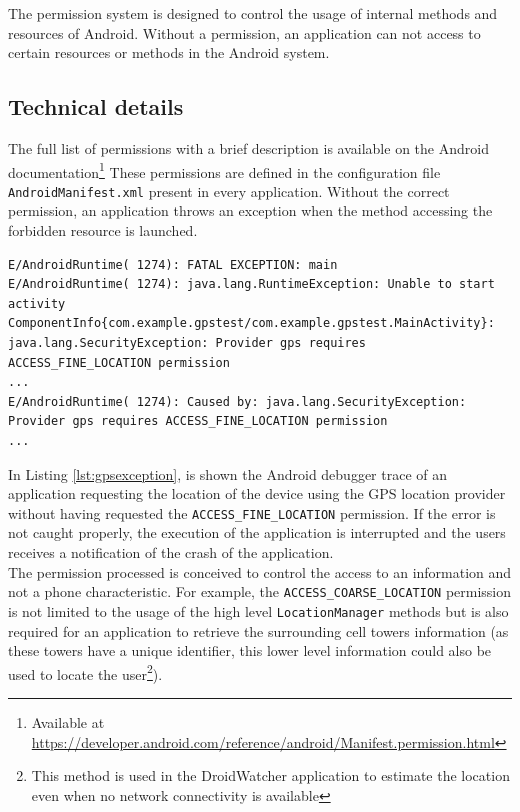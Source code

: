 The permission system is designed to control the usage of internal methods and resources of Android.
Without a permission, an application can not access to certain resources or methods in the Android system.

\subsection{Technical details}
The full list of permissions with a brief description is available on the Android documentation\footnote{Available at \url{https://developer.android.com/reference/android/Manifest.permission.html}}
These permissions are defined in the configuration file \texttt{AndroidManifest.xml} present in every application.
Without the correct permission, an application throws an exception when the method accessing the forbidden resource is launched.

\begin{lstlisting}[breaklines,caption={Example of permission violation log},label={lst:gpsexception},numbers=none]
E/AndroidRuntime( 1274): FATAL EXCEPTION: main
E/AndroidRuntime( 1274): java.lang.RuntimeException: Unable to start activity ComponentInfo{com.example.gpstest/com.example.gpstest.MainActivity}: java.lang.SecurityException: Provider gps requires ACCESS_FINE_LOCATION permission
...
E/AndroidRuntime( 1274): Caused by: java.lang.SecurityException: Provider gps requires ACCESS_FINE_LOCATION permission
...
\end{lstlisting}

In Listing \ref{lst:gpsexception}, is shown the Android debugger trace of an application requesting the location of the device using the GPS location provider without having requested the \texttt{ACCESS\_FINE\_LOCATION} permission.
If the error is not caught properly, the execution of the application is interrupted and the users receives a notification of the crash of the application.\\

The permission processed is conceived to control the access to an information and not a phone characteristic.
For example, the \texttt{ACCESS\_COARSE\_LOCATION} permission is not limited to the usage of the high level \texttt{LocationManager} methods but is also required for an application to retrieve the surrounding cell towers information (as these towers have a unique identifier, this lower level information could also be used to locate the user\footnote{This method is used in the DroidWatcher application to estimate the location even when no network connectivity is available}).


